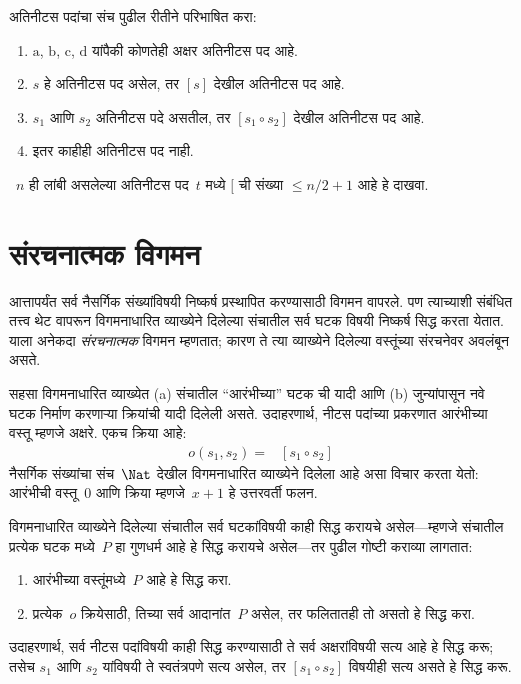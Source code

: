 \begin{prob}
अतिनीटस पदांचा संच पुढील रीतीने परिभाषित करा:
\begin{enumerate}
\item $\mathrm{a}$, $\mathrm{b}$, $\mathrm{c}$, $\mathrm{d}$ यांपैकी कोणतेही अक्षर अतिनीटस पद आहे.
\item $s$ हे अतिनीटस पद असेल, तर $[s]$ देखील अतिनीटस पद आहे.
\item $s_1$ आणि $s_2$ अतिनीटस पदे असतील, तर $[s_1 \circ s_2]$ देखील अतिनीटस पद आहे.
\item इतर काहीही अतिनीटस पद नाही.
\end{enumerate}
~$n$ ही लांबी असलेल्या अतिनीटस पद~$t$ मध्ये $[$ ची संख्या $\le n/2 +1$ आहे हे दाखवा.
\end{prob}












\section{संरचनात्मक विगमन}\label{mth:ind:sti:sec}

आत्तापर्यंत सर्व नैसर्गिक संख्यांविषयी निष्कर्ष प्रस्थापित करण्यासाठी विगमन वापरले. पण त्याच्याशी संबंधित तत्त्व थेट वापरून विगमनाधारित व्याख्येने दिलेल्या संचातील सर्व घटक विषयी निष्कर्ष सिद्ध करता येतात. याला अनेकदा \emph{संरचनात्मक} विगमन म्हणतात; कारण ते त्या व्याख्येने दिलेल्या वस्तूंच्या संरचनेवर अवलंबून असते.

सहसा विगमनाधारित व्याख्येत (a) संचातील “आरंभीच्या” घटक ची यादी आणि (b) जुन्यांपासून नवे घटक निर्माण करणाऱ्या क्रियांची यादी दिलेली असते. उदाहरणार्थ, नीटस पदांच्या प्रकरणात आरंभीच्या वस्तू म्हणजे अक्षरे. एकच क्रिया आहे:
\begin{align*}
  o(s_1, s_2) = & [s_1 \circ s_2]
\end{align*}
नैसर्गिक संख्यांचा संच~$\Nat$ देखील विगमनाधारित व्याख्येने दिलेला आहे असा विचार करता येतो: आरंभीची वस्तू~$0$ आणि क्रिया म्हणजे~$x + 1$ हे उत्तरवर्ती फलन.

विगमनाधारित व्याख्येने दिलेल्या संचातील सर्व घटकांविषयी काही सिद्ध करायचे असेल---म्हणजे संचातील प्रत्येक घटक मध्ये~$P$ हा गुणधर्म आहे हे सिद्ध करायचे असेल---तर पुढील गोष्टी कराव्या लागतात:
\begin{enumerate}
\item आरंभीच्या वस्तूंमध्ये~$P$ आहे हे सिद्ध करा.
\item प्रत्येक~$o$ क्रियेसाठी, तिच्या सर्व आदानांत~$P$ असेल, तर फलितातही तो असतो हे सिद्ध करा.
\end{enumerate}
उदाहरणार्थ, सर्व नीटस पदांविषयी काही सिद्ध करण्यासाठी ते सर्व अक्षरांविषयी सत्य आहे हे सिद्ध करू; तसेच $s_1$ आणि $s_2$ यांविषयी ते स्वतंत्रपणे सत्य असेल, तर $[s_1 \circ s_2]$ विषयीही सत्य असते हे सिद्ध करू.

